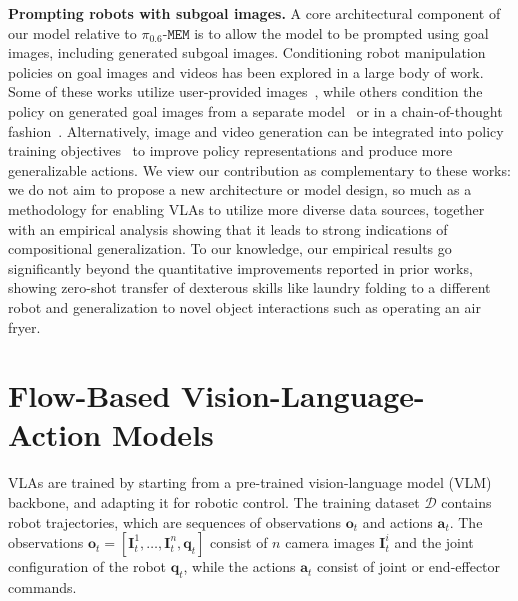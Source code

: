 \documentclass[conference]{IEEEtran}
\newcommand{\ba}{\mathbf{a}}
\newcommand{\bo}{\mathbf{o}}
\newcommand{\bq}{\mathbf{q}}
\newcommand{\bI}{\mathbf{I}}
\newcommand{\data}{\mathcal{D}}
\begin{document}
\noindent \textbf{Prompting robots with subgoal images.} A core architectural component of our model relative to $\pi_{0.6}\texttt{-MEM}$ is to allow the model to be prompted using goal images, including generated subgoal images. Conditioning robot manipulation policies on goal images and videos has been explored in a large body of work. Some of these works utilize user-provided images~\cite{pathak2018zero,chebotar2021actionable,bousmalis2023robocat,myers2023grif}, while others condition the policy on generated goal images from a separate model~\cite{nair2018visual,nair2020hierarchical,black2023zero,ko2024learning,kim2025uniskill,liang2025dreamitate,zhang2026foreact,du2024vlp} or in a chain-of-thought fashion~\cite{zhao2025cot}. Alternatively, image and video generation can be integrated into policy training objectives~\cite{liang2025video,kim2025cosmospolicy,mimicvideo,yuan2026fast,ye2026dreamzero,du2023unipi} to improve policy representations and produce more generalizable actions.
We view our contribution as complementary to these works: we do not aim to propose a new architecture or model design, so much as a methodology for enabling VLAs to utilize more diverse data sources, together with an empirical analysis showing that it leads to strong indications of compositional generalization.
To our knowledge, our empirical results go significantly beyond the quantitative improvements reported in prior works, showing zero-shot transfer of dexterous skills like laundry folding to a different robot and generalization to novel object interactions such as operating an air fryer.






\section{Flow-Based Vision-Language-Action Models}
\label{sec:prelim}

VLAs are trained by starting from a pre-trained vision-language model (VLM) backbone, and adapting it for robotic control. The training dataset $\data$ contains robot trajectories, which are sequences of observations $\bo_t$ and actions $\ba_t$. The observations $\bo_t = [\bI_t^1, \ldots, \bI_t^n, \bq_t]$ consist of $n$ camera images $\bI_t^i$ and the joint configuration of the robot $\bq_t$, while the actions $\ba_t$ consist of joint or end-effector commands. 
\end{document}
